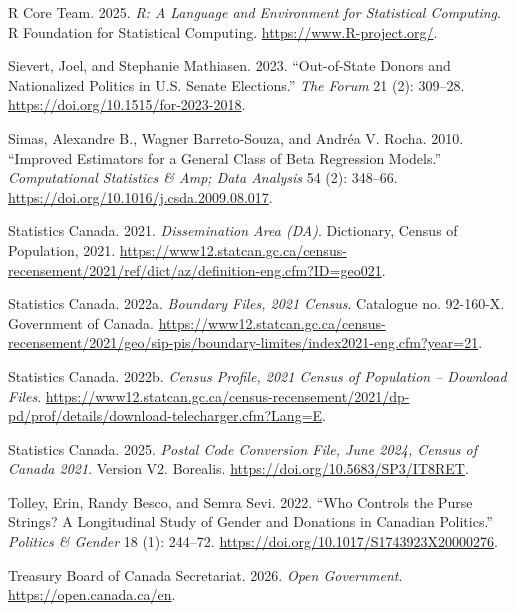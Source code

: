 \documentclass[
  letterpaper,
  DIV=11,
  numbers=noendperiod]{scrartcl}
\newlength{\cslhangindent}
\newenvironment{CSLReferences}[2] %
 {\begin{list}{}{%
  \setlength{\itemindent}{0pt}
  \setlength{\leftmargin}{0pt}
  \setlength{\parsep}{0pt}
  \ifodd #1
   \setlength{\leftmargin}{\cslhangindent}
   \setlength{\itemindent}{-1\cslhangindent}
  \fi
  \setlength{\itemsep}{#2\baselineskip}}}
 {\end{list}}
\begin{document}
\begin{CSLReferences}{1}{1}
R Core Team. 2025. \emph{R: A Language and Environment for Statistical
Computing}. R Foundation for Statistical Computing.
\url{https://www.R-project.org/}.

Sievert, Joel, and Stephanie Mathiasen. 2023. {``Out-of-{State} {Donors}
and {Nationalized} {Politics} in {U}.{S}. {Senate} {Elections}.''}
\emph{The Forum} 21 (2): 309--28.
\url{https://doi.org/10.1515/for-2023-2018}.

Simas, Alexandre B., Wagner Barreto-Souza, and Andréa V. Rocha. 2010.
{``Improved Estimators for a General Class of Beta Regression Models.''}
\emph{Computational Statistics \& Amp; Data Analysis} 54 (2): 348--66.
\url{https://doi.org/10.1016/j.csda.2009.08.017}.

Statistics Canada. 2021. \emph{Dissemination Area ({DA})}. Dictionary,
Census of Population, 2021.
\url{https://www12.statcan.gc.ca/census-recensement/2021/ref/dict/az/definition-eng.cfm?ID=geo021}.

Statistics Canada. 2022a. \emph{Boundary Files, 2021 Census}. Catalogue
no. 92-160-X. Government of Canada.
\url{https://www12.statcan.gc.ca/census-recensement/2021/geo/sip-pis/boundary-limites/index2021-eng.cfm?year=21}.

Statistics Canada. 2022b. \emph{Census Profile, 2021 {Census} of
Population -- Download Files}.
\url{https://www12.statcan.gc.ca/census-recensement/2021/dp-pd/prof/details/download-telecharger.cfm?Lang=E}.

Statistics Canada. 2025. \emph{Postal Code Conversion File, June 2024,
Census of Canada 2021}. Version V2. Borealis.
\url{https://doi.org/10.5683/SP3/IT8RET}.

Tolley, Erin, Randy Besco, and Semra Sevi. 2022. {``Who {Controls} the
{Purse} {Strings}? {A} {Longitudinal} {Study} of {Gender} and
{Donations} in {Canadian} {Politics}.''} \emph{Politics \& Gender} 18
(1): 244--72. \url{https://doi.org/10.1017/S1743923X20000276}.

Treasury Board of Canada Secretariat. 2026. \emph{Open {Government}}.
\url{https://open.canada.ca/en}.


\end{CSLReferences}
\end{document}
